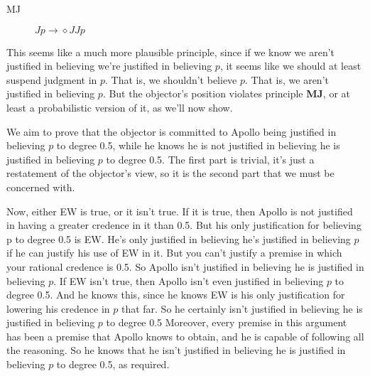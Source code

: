 \begin{description}
\item[MJ] $Jp \rightarrow \diamond JJp$
\end{description}

This seems like a much more plausible principle, since if we know we aren't justified in believing we're justified in believing $p$, it seems like we should at least suspend judgment in $p$. That is, we shouldn't believe $p$. That is, we aren't justified in believing $p$. But the objector's position violates principle \textbf{MJ}, or at least a probabilistic version of it, as we'll now show.

We aim to prove that the objector is committed to Apollo being justified in believing $p$ to degree 0.5, while he knows he is not justified in believing he is justified in believing $p$ to degree 0.5. The first part is trivial, it's just a restatement of the objector's view, so it is the second part that we must be concerned with. 

Now, either EW is true, or it isn't true. If it is true, then Apollo is not justified in having a greater credence in it than 0.5. But his only justification for believing p to degree 0.5 is EW. He's only justified in believing he's justified in believing $p$ if he can justify his use of EW in it. But you can't justify a premise in which your rational credence is 0.5. So Apollo isn't justified in believing he is justified in believing $p$. If EW isn't true, then Apollo isn't even justified in believing $p$ to degree 0.5. And he knows this, since he knows EW is his only justification for lowering his credence in $p$ that far. So he certainly isn't justified in believing he is justified in believing $p$ to degree 0.5 Moreover, every premise in this argument has been a premise that Apollo knows to obtain, and he is capable of following all the reasoning. So he knows that he isn't justified in believing he is justified in believing $p$ to degree 0.5, as required.

